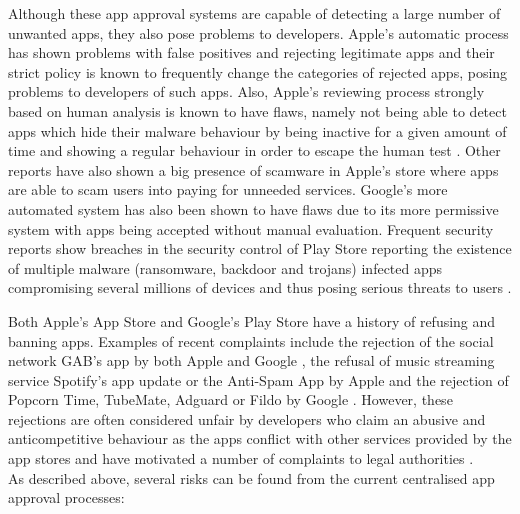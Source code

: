 Although these app approval systems are capable of detecting a large number of unwanted apps, they also pose problems to developers. Apple's automatic process has shown problems with false positives and rejecting legitimate apps \cite{AppleInsiderWebsite} and their strict policy is known to frequently change the categories of rejected apps, posing problems to developers of such apps. Also, Apple's reviewing process strongly based on human analysis is known to have flaws, namely not being able to detect apps which hide their malware behaviour by being inactive for a given amount of time and showing a regular behaviour in order to escape the human test \cite{AppleFlaws1}. Other reports \cite{AppleFlaws2} have also shown a big presence of scamware in Apple's store where apps are able to scam users into paying for unneeded services. Google's more automated system has also been shown to have flaws \cite{AppleApprovalFortune} due to its more permissive system with apps being accepted without manual evaluation. Frequent security reports show breaches in the security control of Play Store reporting the existence of multiple malware (ransomware, backdoor and trojans) infected apps compromising several millions of devices and thus posing serious threats to users \cite{GoogleMalware1, GoogleMalware2, GoogleMalware3}.

Both Apple's App Store and Google's Play Store have a history of refusing and banning apps. Examples of recent complaints include the rejection of the social network GAB's app by both Apple and Google \cite{AppRefusedGAB}, the refusal of music streaming service Spotify's app update \cite{AppleRefuseSpotify} or the Anti-Spam App \cite{AppleRefuseTRIAD} by Apple and the rejection of Popcorn Time, TubeMate, Adguard or Fildo by Google \cite{GoogleBannedApps}. However, these rejections are often considered unfair by developers who claim an abusive and anticompetitive behaviour as the apps conflict with other services provided by the app stores and have motivated a number of complaints to legal authorities \cite{AntiCompetitiveClaim}. \\

As described above, several risks can be found from the current centralised app approval processes:

